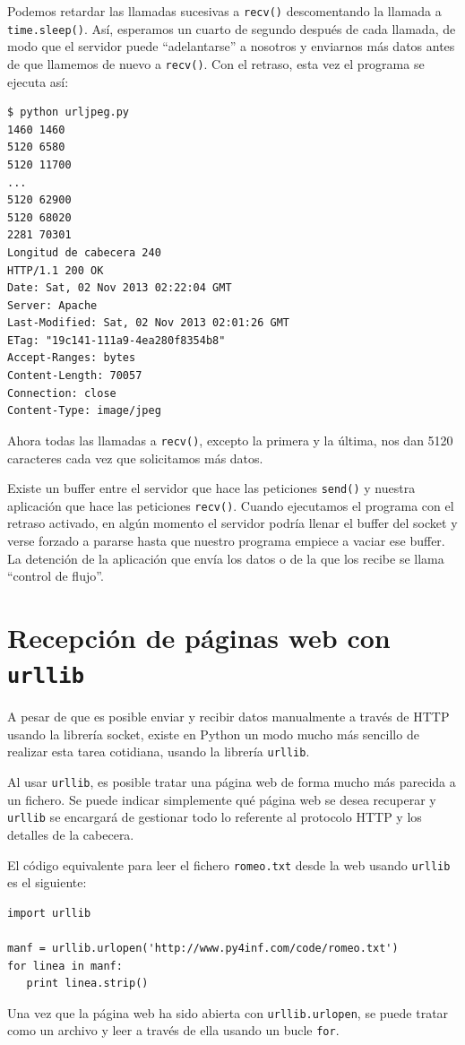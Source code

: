 Podemos retardar las llamadas sucesivas a {\tt recv()} descomentando la llamada
a {\tt time.sleep()}. Así, esperamos un cuarto de segundo después de cada llamada,
de modo que el servidor puede ``adelantarse'' a nosotros y enviarnos más datos
antes de que llamemos de nuevo a {\tt recv()}. Con el retraso, esta vez el programa
se ejecuta así:
\beforeverb
\begin{verbatim}
$ python urljpeg.py 
1460 1460
5120 6580
5120 11700
...
5120 62900
5120 68020
2281 70301
Longitud de cabecera 240
HTTP/1.1 200 OK
Date: Sat, 02 Nov 2013 02:22:04 GMT
Server: Apache
Last-Modified: Sat, 02 Nov 2013 02:01:26 GMT
ETag: "19c141-111a9-4ea280f8354b8"
Accept-Ranges: bytes
Content-Length: 70057
Connection: close
Content-Type: image/jpeg
\end{verbatim}
\afterverb
%
Ahora todas las llamadas a {\tt recv()}, excepto la primera y la última,
nos dan 5120 caracteres cada vez que solicitamos más datos.

Existe un buffer entre el servidor que hace las peticiones {\tt send()}
y nuestra aplicación que hace las peticiones {\tt recv()}. Cuando ejecutamos
el programa con el retraso activado, en algún momento el servidor podría
llenar el buffer del socket y verse forzado a pararse hasta que
nuestro programa empiece a vaciar ese buffer. La detención de la aplicación
que envía los datos o de la que los recibe se llama
``control de flujo''.

\section{Recepción de páginas web con {\tt urllib}}

A pesar de que es posible enviar y recibir datos manualmente a través de HTTP
usando la librería socket, existe en Python un modo mucho más sencillo de
realizar esta tarea cotidiana,
usando la librería {\tt urllib}.

Al usar {\tt urllib},
es posible tratar una página web de forma mucho más parecida a un fichero. Se puede
indicar simplemente qué página web se desea recuperar y
{\tt urllib} se encargará de gestionar todo lo referente al protocolo HTTP y
los detalles de la cabecera.

El código equivalente para leer el fichero {\tt romeo.txt}
desde la web usando {\tt urllib} es el siguiente:

\beforeverb
\begin{verbatim}
import urllib

manf = urllib.urlopen('http://www.py4inf.com/code/romeo.txt')
for linea in manf:
   print linea.strip()
\end{verbatim}
\afterverb
%
Una vez que la página web ha sido abierta con
{\tt urllib.urlopen}, se puede tratar como
un archivo y leer a través de ella usando un
bucle {\tt for}.

